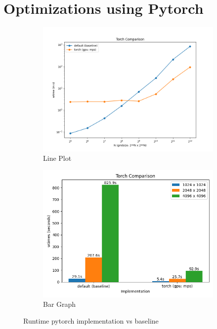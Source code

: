 \documentclass[a4paper,10pt]{article}
\begin{document}

\section{Optimizations using Pytorch}
\begin{figure}[h]
     \centering
     \begin{subfigure}[b]{0.45\textwidth}
         \centering
         \includegraphics[width=\linewidth]{images/torch/torch_mps_runtime.png}
         \caption{Line Plot}
         \label{fig:torch_plot}
     \end{subfigure}
     \hfill
     \begin{subfigure}[b]{0.45\textwidth}
         \centering
         \includegraphics[width=\linewidth]{images/torch/torch_mps_bars.png}
         \caption{Bar Graph}
         \label{fig:torch_bar}
     \end{subfigure}
  \caption{Runtime pytorch implementation vs baseline}
  \label{fig:torch_runtime}
\end{figure}
\end{document}
